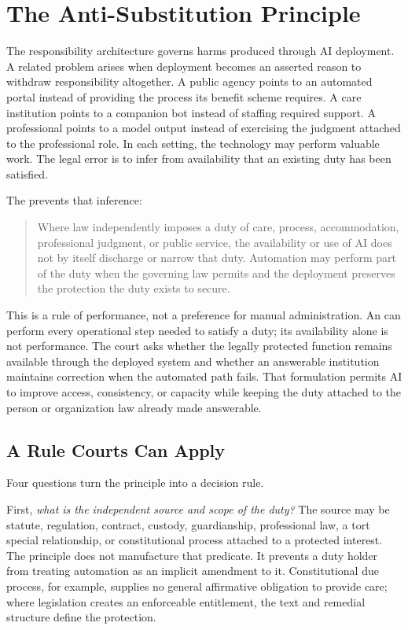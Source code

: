 \section{The Anti-Substitution Principle}
\label{sec:anti-substitution}

The responsibility architecture governs harms produced through AI deployment. A related problem arises when deployment becomes an asserted reason to withdraw responsibility altogether. A public agency points to an automated portal instead of providing the process its benefit scheme requires. A care institution points to a companion bot instead of staffing required support. A professional points to a model output instead of exercising the judgment attached to the professional role. In each setting, the technology may perform valuable work. The legal error is to infer from availability that an existing duty has been satisfied.

The  prevents that inference:

\begin{quote}
Where law independently imposes a duty of care, process, accommodation, professional judgment, or public service, the availability or use of AI does not by itself discharge or narrow that duty. Automation may perform part of the duty when the governing law permits and the deployment preserves the protection the duty exists to secure.
\end{quote}

This is a rule of performance, not a preference for manual administration. An  can perform every operational step needed to satisfy a duty; its availability alone is not performance. The court asks whether the legally protected function remains available through the deployed system and whether an answerable institution maintains correction when the automated path fails. That formulation permits AI to improve access, consistency, or capacity while keeping the duty attached to the person or organization law already made answerable.

\subsection{A Rule Courts Can Apply}

Four questions turn the principle into a decision rule.

First, \emph{what is the independent source and scope of the duty?} The source may be statute, regulation, contract, custody, guardianship, professional law, a tort special relationship, or constitutional process attached to a protected interest. The principle does not manufacture that predicate. It prevents a duty holder from treating automation as an implicit amendment to it. Constitutional due process, for example, supplies no general affirmative obligation to provide care; where legislation creates an enforceable entitlement, the text and remedial structure define the protection.

